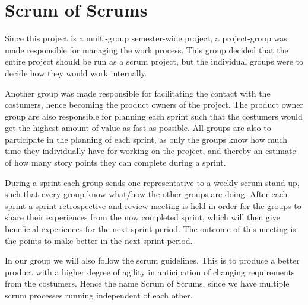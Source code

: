 \section{Scrum of Scrums}
Since this project is a multi-group semester-wide project, a project-group was made responsible for managing the work process.
This group decided that the entire project should be run as a scrum project, but the individual groups were to decide how they would work internally.

Another group was made responsible for facilitating the contact with the costumers, hence becoming the product owners of the project.
The product owner group are also responsible for planning each sprint such that the costumers would get the highest amount of value as fast as possible.
All groups are also to participate in the planning of each sprint, as only the groups know how much time they individually have for working on the project, and thereby an estimate of how many story points they can complete during a sprint.

During a sprint each group sends one representative to a weekly scrum stand up, such that every group know what/how the other groups are doing.
After each sprint a sprint retrospective and review meeting is held in order for the groups to share their experiences from the now completed sprint, which will then give beneficial experiences for the next sprint period.
The outcome of this meeting is the points to make better in the next sprint period.

In our group we will also follow the scrum guidelines. This is to produce a better product with a higher degree of agility in anticipation of changing requirements from the costumers.
Hence the name Scrum of Scrums, since we have multiple scrum processes running independent of each other.
